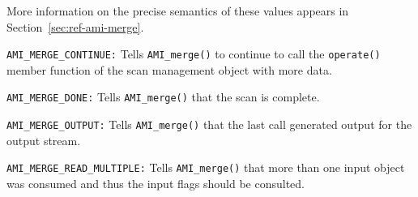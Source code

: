 More information on the precise semantics of these values appears in
Section~\ref{sec:ref-ami-merge}.
\begin{description}
\item\lstinline|AMI_MERGE_CONTINUE:| Tells
\lstinline|AMI_merge()| to continue
  to call the \lstinline|operate()| member function of the scan management
  object with more data.
\item\lstinline|AMI_MERGE_DONE:| Tells \lstinline|AMI_merge()| that the scan is
  complete. 
\item\lstinline|AMI_MERGE_OUTPUT:|  Tells \lstinline|AMI_merge()| that the
  last call generated output for the output stream.
\item\lstinline|AMI_MERGE_READ_MULTIPLE:|  Tells \lstinline|AMI_merge()| that
  more than one input object was consumed and thus the input flags
  should be consulted.
\end{description}


